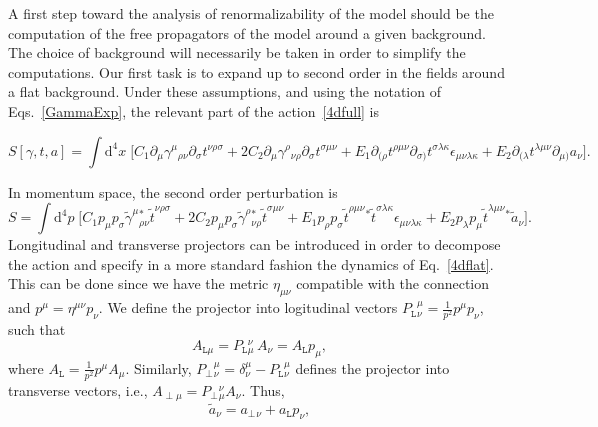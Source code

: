 \documentclass[aps,prd,12pt,twocolumn,superscriptaddress,showpacs,showkeys,reprint,longbibliography]{revtex4-1}
\renewcommand{\(}{\left(}
\renewcommand{\)}{\right)}
\renewcommand{\[}{\left[}
\renewcommand{\]}{\right]}
\newcommand{\dn}[2]{{\mathrm{d}}^{#1}{#2}\;}
\begin{document}
A first step toward the analysis of renormalizability of the model should be the computation of the free propagators of the model around a given background. The choice of background will necessarily be taken in order to simplify the computations.  Our first task is to expand up to second order in the fields around a flat background. Under these assumptions, and using the notation of Eqs.~\eqref{GammaExp}, the relevant part of the action~\eqref{4dfull} is
\begin{widetext}
  \begin{dmath}[compact, spread=2pt]
    \label{4dflatx}
    S[\gamma,t,a] =
    \int\dn{4}{x} \bigg[
      C_1 \partial_{\mu}\gamma^{\mu}{}_{\rho\nu} \partial_\sigma t^{\nu\rho\sigma}
      +2 C_2 \partial_{\mu}\gamma^{\rho}{}_{\nu\rho} \partial_\sigma t^{\sigma\mu\nu}
      + E_1 \partial_{(\rho}t^{\rho\mu\nu}\partial_{\sigma)}t^{\sigma\lambda\kappa}\epsilon_{\mu\nu\lambda\kappa}
      + E_2 \partial_{(\lambda} t^{\lambda\mu\nu}\partial_{\mu)} a_\nu
      \bigg].
  \end{dmath}
\end{widetext}
In momentum space, the second order perturbation is
\begin{dmath}[compact, spread=2pt]
  \label{4dflat}
  S =
  \int\dn{4}{p}\bigg[
    C_1 p_{\mu} p_\sigma\tilde\gamma^{\mu}{}_{\rho\nu}^* \tilde t^{\nu\rho\sigma}
    + 2 C_2 p_{\mu} p_\sigma\tilde\gamma^{\rho}{}_{\nu\rho}^* \tilde t^{\sigma\mu\nu}
    + E_1 p_{\rho} p_{\sigma} \tilde t^{\rho\mu\nu}{}^*\tilde t^{\sigma\lambda\kappa} \epsilon_{\mu\nu\lambda\kappa}
    + E_2 p_{\lambda} p_{\mu} \tilde t^{\lambda\mu\nu}{}^* \tilde a_\nu
    \bigg].
\end{dmath}
Longitudinal and transverse projectors can be introduced in order to decompose the action and specify in a more standard fashion the dynamics of Eq.~\eqref{4dflat}. This can be done since we have the metric $\eta_{\mu\nu}$ compatible with the connection and $p^\mu = \eta^{\mu\nu}p_\nu$. We define the projector into logitudinal vectors $P_{\texttt{L}}{}^\mu_\nu = \tfrac{1}{p^2}p^\mu p_\nu $, such that $$A_{\texttt{L}\mu} = P_{\texttt{L}}{}^\nu_\mu \, A_\nu = A_{\texttt{L}}{}p_{\mu},$$ where $A_{\texttt{L}}=\tfrac{1}{p^2} p^\mu A_\mu$. Similarly, $P_\perp{}^\mu_\nu=\delta^\mu_\nu -P_{\texttt{L}}{}^\mu_\nu$ defines the projector into transverse vectors, i.e., $A_{\perp \mu}=P_{\perp}{}_\mu^\nu A_\nu$. Thus,
\begin{dmath}
  \label{transversea}
  \tilde a_\nu=a_\perp{}_{\nu}+a_{\texttt{L}} p_\nu,
\end{dmath}
\end{document}
